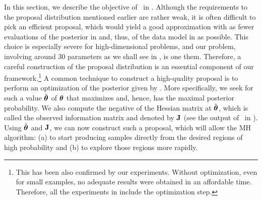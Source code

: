 In this section, we describe the objective of \ in .
Although the requirements to the proposal distribution mentioned earlier are rather weak, it is often difficult to pick an efficient proposal, which would yield a good approximation with as fewer evaluations of the posterior in  and, thus, of the data model in  as possible.
This choice is especially severe for high-dimensional problems, and our problem, involving around 30 parameters as we shall see in , is one them.
Therefore, a careful construction of the proposal distribution is an essential component of our framework.\footnote{This has been also confirmed by our experiments. Without optimization, even for small examples, no adequate results were obtained in an affordable time. Therefore, all the experiments in  include the optimization step.}
A common technique to construct a high-quality proposal is to perform an optimization of the posterior given by .
More specifically, we seek for such a value $\hat{{\boldsymbol\theta}}$ of ${\boldsymbol\theta}$ that maximizes  and, hence, has the maximal posterior probability.
We also compute the negative of the Hessian matrix at $\hat{{\boldsymbol\theta}}$, which is called the observed information matrix and denoted by $\mathbf{J}$ (see the output of \ in ).
Using $\hat{{\boldsymbol\theta}}$ and $\mathbf{J}$, we can now construct such a proposal, which will allow the MH algorithm: (a) to start producing samples directly from the desired regions of high probability and (b) to explore those regions more rapidly.
